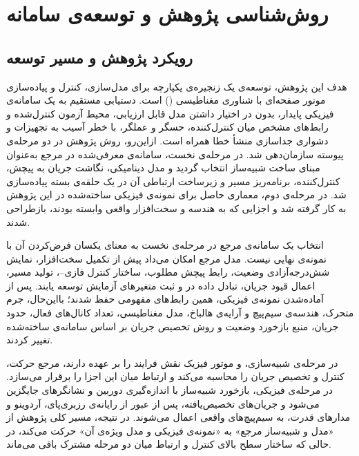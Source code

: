 \chapter{روش‌شناسی پژوهش و توسعه‌ی سامانه}
\label{ch:method}

\section{رویکرد پژوهش و مسیر توسعه}
\label{sec:method-research-process}

هدف این پژوهش، توسعه‌ی یک زنجیره‌ی یکپارچه برای مدل‌سازی، کنترل و پیاده‌سازی موتور صفحه‌ای با شناوری مغناطیسی () است. دستیابی مستقیم به یک سامانه‌ی فیزیکی پایدار، بدون در اختیار داشتن مدل قابل ارزیابی، محیط آزمون کنترل‌شده و رابط‌های مشخص میان کنترل‌کننده، حسگر و عملگر، با خطر آسیب به تجهیزات و دشواری جداسازی منشأ خطا همراه است. ازاین‌رو، روش پژوهش در دو مرحله‌ی پیوسته سازمان‌دهی شد. در مرحله‌ی نخست، سامانه‌ی معرفی‌شده در مرجع \cite{xuModularMaglevDesign2024d} به‌عنوان مبنای ساخت شبیه‌ساز انتخاب گردید و مدل دینامیکی، نگاشت جریان به پیچش، کنترل‌کننده، برنامه‌ریز مسیر و زیرساخت ارتباطی آن در یک حلقه‌ی بسته پیاده‌سازی شد. در مرحله‌ی دوم، معماری حاصل برای نمونه‌ی فیزیکی ساخته‌شده در این پژوهش به کار گرفته شد و اجزایی که به هندسه و سخت‌افزار واقعی وابسته بودند، بازطراحی شدند.

انتخاب یک سامانه‌ی مرجع در مرحله‌ی نخست به معنای یکسان فرض‌کردن آن با نمونه‌ی نهایی نیست. مدل مرجع امکان می‌داد پیش از تکمیل سخت‌افزار، نمایش شش‌درجه‌آزادی وضعیت، رابط پیچش مطلوب، ساختار کنترل فازی--، تولید مسیر، اعمال قیود جریان، تبادل داده در  و ثبت متغیرهای آزمایش توسعه یابند. پس از آماده‌شدن نمونه‌ی فیزیکی، همین رابط‌های مفهومی حفظ شدند؛ بااین‌حال، جرم متحرک، هندسه‌ی سیم‌پیچ و آرایه‌ی هالباخ، مدل مغناطیسی، تعداد کانال‌های فعال، حدود جریان، منبع بازخورد وضعیت و روش تخصیص جریان بر اساس سامانه‌ی ساخته‌شده تغییر کردند.

در مرحله‌ی شبیه‌سازی،  و موتور فیزیک  نقش فرایند را بر عهده دارند،  مرجع حرکت، کنترل و تخصیص جریان را محاسبه می‌کند و  ارتباط میان این اجزا را برقرار می‌سازد. در مرحله‌ی فیزیکی، بازخورد شبیه‌ساز با اندازه‌گیری دوربین و نشانگرهای  جایگزین می‌شود و جریان‌های تخصیص‌یافته، پس از عبور از رایانه‌ی رزبری‌پای، آردوینو و مدارهای قدرت، به سیم‌پیچ‌های واقعی اعمال می‌شوند. در نتیجه، مسیر کلی پژوهش از «مدل و شبیه‌ساز مرجع» به «نمونه‌ی فیزیکی و مدل ویژه‌ی آن» حرکت می‌کند، در حالی که ساختار سطح بالای کنترل و ارتباط میان دو مرحله مشترک باقی می‌ماند.


